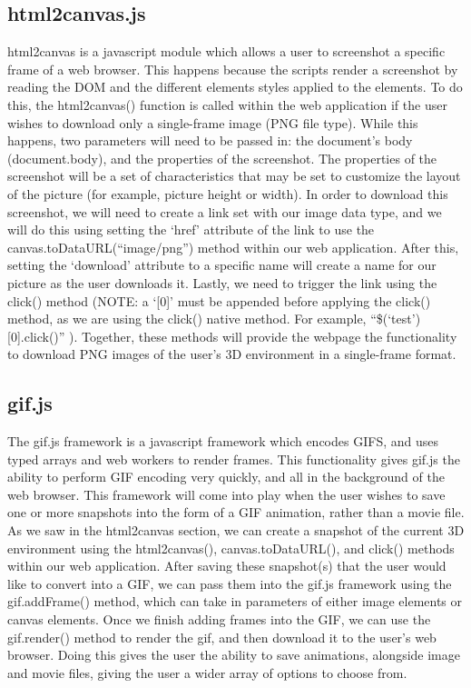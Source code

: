 \documentclass[letterpaper,10pt,titlepage, onecolumn, draftclsnofoot]{IEEEtran}
\begin{document}
\subsection{html2canvas.js}
html2canvas\cite{html2canvas} is a javascript module which allows a user to screenshot a specific frame of a web browser. This happens because the scripts render a screenshot by reading the DOM and the different elements styles applied to the elements. To do this, the html2canvas() function is called within the web application if the user wishes to download only a single-frame image (PNG file type). While this happens, two parameters will need to be passed in: the document’s body (document.body), and the properties of the screenshot. The properties of the screenshot will be a set of characteristics that may be set to customize the layout of the picture (for example, picture height or width). \newline
\indent In order to download this screenshot, we will need to create a link set with our image data type, and we will do this using setting the ‘href’ attribute of the link to use the canvas.toDataURL(“image/png”) method within our web application. After this, setting the ‘download’ attribute to a specific name will create a name for our picture as the user downloads it. Lastly, we need to trigger the link using the click() method (NOTE: a ‘[0]’ must be appended before applying the click() method, as we are using the click() native method. For example, “\$(‘test’)[0].click()” ). Together, these methods will provide the webpage the functionality to download PNG images of the user’s 3D environment in a single-frame format.

\subsection{gif.js}
The gif.js\cite{gif.js} framework is a javascript framework which encodes GIFS, and uses typed arrays and web workers to render frames. This functionality gives gif.js the ability to perform GIF encoding very quickly, and all in the background of the web browser. This framework will come into play when the user wishes to save one or more snapshots into the form of a GIF animation, rather than a movie file. As we saw in the html2canvas section, we can create a snapshot of the current 3D environment using the html2canvas(), canvas.toDataURL(), and click() methods within our web application. After saving these snapshot(s) that the user would like to convert into a GIF, we can pass them into the gif.js framework using the gif.addFrame() method, which can take in parameters of either image elements or canvas elements. Once we finish adding frames into the GIF, we can use the gif.render() method to render the gif, and then download it to the user’s web browser. Doing this gives the user the ability to save animations, alongside image and movie files, giving the user a wider array of options to choose from. 
\newline
\end{document}
